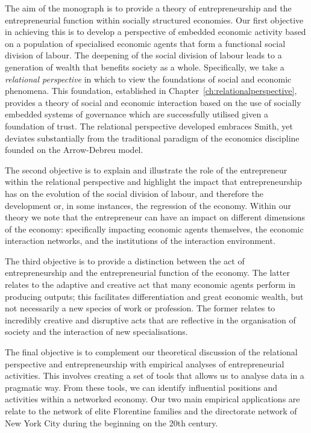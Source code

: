 The aim of the monograph is to provide a theory of entrepreneurship and the entrepreneurial function within socially structured economies. Our first objective in achieving this is to develop a perspective of embedded economic activity based on a population of specialised economic agents that form a functional social division of labour. The deepening of the social division of labour leads to a generation of wealth that benefits society as a whole. Specifically, we take a \emph{relational perspective} in which to view the foundations of social and economic phenomena. This foundation, established in Chapter~\ref{ch:relationalperspective}, provides a theory of social and economic interaction based on the use of socially embedded systems of governance which are successfully utilised given a foundation of trust. The relational perspective developed embraces Smith, yet deviates substantially from the traditional paradigm of the economics discipline founded on the Arrow-Debreu model.

The second objective is to explain and illustrate the role of the entrepreneur within the relational perspective and highlight the impact that entrepreneurship has on the evolution of the social division of labour, and therefore the development or, in some instances, the regression of the economy. Within our theory we note that the entrepreneur can have an impact on different dimensions of the economy: specifically impacting economic agents themselves, the economic interaction networks, and the institutions of the interaction environment.

The third objective is to provide a distinction between the act of entrepreneurship and the entrepreneurial function of the economy. The latter relates to the adaptive and creative act that many economic agents perform in producing outputs; this facilitates differentiation and great economic wealth, but not necessarily a new species of work or profession. The former relates to incredibly creative and disruptive acts that are reflective in the organisation of society and the interaction of new specialisations.

The final objective is to complement our theoretical discussion of the relational perspective and entrepreneurship with empirical analyses of entrepreneurial activities. This involves creating a set of tools that allows us to analyse data in a pragmatic way. From these tools, we can identify influential positions and activities within a networked economy. Our two main empirical applications are relate to the network of elite Florentine families and the directorate network of New York City during the beginning on the 20th century.


